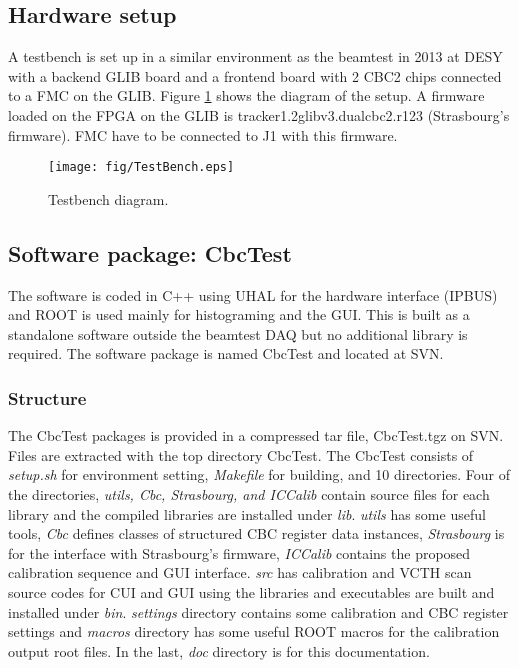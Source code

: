 \documentclass[11pt,a4paper]{article}
\begin{document}
	\subsection{Hardware setup}
	A testbench is set up in a similar environment as the beamtest in 2013 at DESY with a backend GLIB\cite{GLIB} board and a frontend board with 2 CBC2 chips connected to a FMC on the GLIB.
	Figure \ref{fig:testbench} shows the diagram of the setup.  A firmware loaded on the FPGA on the GLIB is tracker1.2glibv3.dualcbc2.r123 (Strasbourg's firmware)\cite{FIRMWARE}.  FMC have to be connected to J1 with this firmware.

	\begin{figure}[htbp]
	\centering
	\texttt{[image: fig/TestBench.eps]}
	\caption{Testbench diagram. }\label{fig:testbench}
	\end{figure}

	\subsection{Software package: CbcTest}
	The software is coded in C++ using UHAL\cite{UHAL} for the hardware interface (IPBUS) and ROOT\cite{ROOT} is used mainly for histograming and the GUI. 
	This is built as a standalone software outside the beamtest DAQ but no additional library is required. The software package is named CbcTest and located at SVN\cite{CBCTEST}. 

	\subsubsection{Structure}
	The CbcTest packages is provided in a compressed tar file, CbcTest.tgz on SVN. Files are extracted with the top directory CbcTest. 
	The CbcTest consists of {\it setup.sh} for environment setting, {\it Makefile} for building, and 10 directories.  
	Four of the directories, {\it utils, Cbc, Strasbourg, and ICCalib} contain source files for each library and the compiled libraries are installed under {\it lib}.
{\it utils} has some useful tools, {\it Cbc} defines classes of structured CBC register data instances, {\it Strasbourg}  is for the interface with Strasbourg's firmware, {\it ICCalib} contains the proposed calibration sequence and GUI interface.  
{\it src} has calibration and VCTH scan source codes for CUI and GUI using the libraries and executables are built and installed under {\it bin}. 
{\it settings} directory contains some calibration and CBC register settings and {\it macros} directory has some useful ROOT macros for the calibration output root files. 
In the last, {\it doc} directory is for this documentation.   
\end{document}
